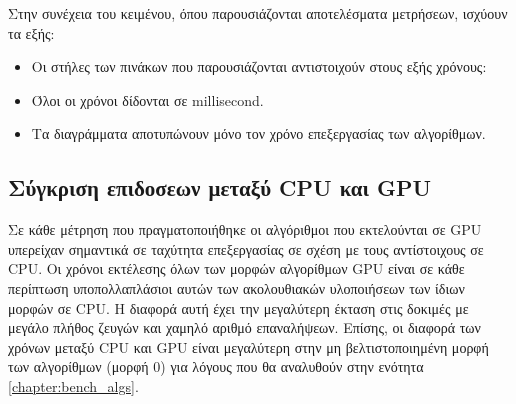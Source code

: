 Στην συνέχεια του κειμένου, όπου παρουσιάζονται αποτελέσματα μετρήσεων, ισχύουν τα εξής:
\begin{itemize}
\item Οι στήλες των πινάκων που παρουσιάζονται αντιστοιχούν στους εξής χρόνους:
\item Όλοι οι χρόνοι δίδονται σε millisecond. 
\item Τα διαγράμματα αποτυπώνουν μόνο τον χρόνο επεξεργασίας των αλγορίθμων.
\end{itemize}
\subsection{Σύγκριση επιδοσεων μεταξύ CPU και GPU}
\label{chapter:bench_cpugpu}
\noindent Σε κάθε μέτρηση που πραγματοποιήθηκε οι αλγόριθμοι που εκτελούνται σε GPU υπερείχαν σημαντικά σε ταχύτητα επεξεργασίας σε σχέση με τους αντίστοιχους σε CPU. Οι χρόνοι εκτέλεσης όλων των μορφών αλγορίθμων GPU είναι σε κάθε περίπτωση υποπολλαπλάσιοι αυτών των ακολουθιακών υλοποιήσεων των ίδιων μορφών σε CPU. Η διαφορά αυτή έχει την μεγαλύτερη έκταση στις δοκιμές με μεγάλο πλήθος ζευγών και χαμηλό αριθμό επαναλήψεων. Επίσης, οι διαφορά των χρόνων μεταξύ CPU και GPU είναι μεγαλύτερη στην μη βελτιστοποιημένη μορφή των αλγορίθμων (μορφή 0) για λόγους που θα αναλυθούν στην ενότητα \ref{chapter:bench_algs}.

